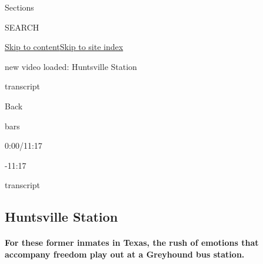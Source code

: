 Sections

SEARCH

\protect\hyperlink{site-content}{Skip to
content}\protect\hyperlink{site-index}{Skip to site index}

new video loaded: Huntsville Station

transcript

Back

bars

0:00/11:17

-11:17

transcript

\hypertarget{huntsville-station}{%
\subsection{Huntsville Station}\label{huntsville-station}}

\hypertarget{for-these-former-inmates-in-texas-the-rush-of-emotions-that-accompany-freedom-play-out-at-a-greyhound-bus-station}{%
\paragraph{For these former inmates in Texas, the rush of emotions that
accompany freedom play out at a Greyhound bus
station.}\label{for-these-former-inmates-in-texas-the-rush-of-emotions-that-accompany-freedom-play-out-at-a-greyhound-bus-station}}

